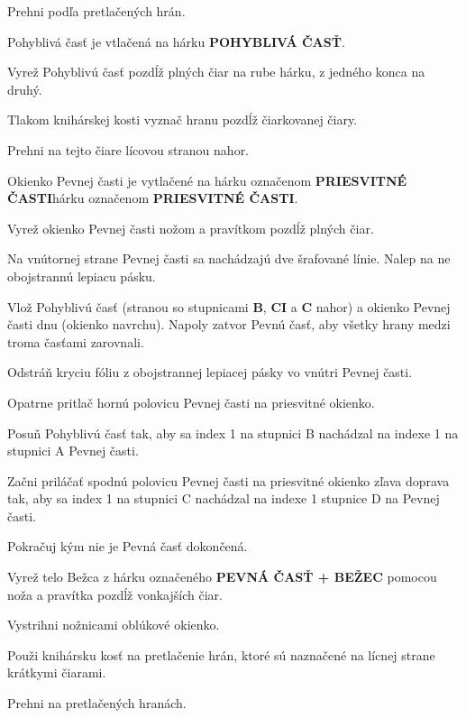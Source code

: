 \begin{multicols*}{3}
{Prehni podľa pretlačených hrán.


\footnotesize Pohyblivá časť je vtlačená na hárku \textbf{POHYBLIVÁ ČASŤ}.\normalsize

Vyrež Pohyblivú časť pozdĺž plných čiar na rube hárku, z jedného konca na druhý.

Tlakom knihárskej kosti vyznač hranu pozdĺž čiarkovanej čiary.

Prehni na tejto čiare lícovou stranou nahor.


\footnotesize Okienko Pevnej časti je vytlačené na hárku označenom \textbf{PRIESVITNÉ ČASTI}hárku označenom \textbf{PRIESVITNÉ ČASTI}. \normalsize

Vyrež okienko Pevnej časti nožom a pravítkom pozdĺž plných čiar.


Na vnútornej strane Pevnej časti sa nachádzajú dve šrafované línie. Nalep na ne obojstrannú lepiacu pásku.

Vlož Pohyblivú časť (stranou so stupnicami \textbf{B}, \textbf{CI} a \textbf{C} nahor) a okienko Pevnej časti dnu (okienko navrchu). Napoly zatvor Pevnú časť, aby všetky hrany medzi troma časťami zarovnali.

Odstráň kryciu fóliu z obojstrannej lepiacej pásky vo vnútri Pevnej časti.

Opatrne pritlač hornú polovicu Pevnej časti na priesvitné okienko.

Posuň Pohyblivú časť tak, aby sa index 1 na stupnici B nachádzal na indexe 1 na stupnici A Pevnej časti.

Začni priláčať spodnú polovicu Pevnej časti na priesvitné okienko zľava doprava tak, aby sa index 1 na stupnici C nachádzal na indexe 1 stupnice D na Pevnej časti.

Pokračuj kým nie je Pevná časť dokončená.


Vyrež telo Bežca z hárku označeného \textbf{PEVNÁ ČASŤ + BEŽEC} pomocou noža a pravítka pozdĺž vonkajších čiar.

Vystrihni nožnicami oblúkové okienko.

Použi knihársku kosť na pretlačenie hrán, ktoré sú naznačené na lícnej strane krátkymi čiarami.

Prehni na pretlačených hranách.

}
\end{multicols*}

